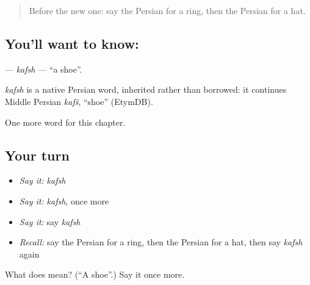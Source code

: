 \begin{quote}
Before the new one: say the Persian for a ring, then the Persian for a hat.
\end{quote}

\subsection*{You'll want to know: }
\textbf{} — \emph{kafsh} — \textquotedblleft{}a shoe\textquotedblright{}.

\begin{cousinweb}
\emph{kafsh} is a native Persian word, inherited rather than borrowed: it continues Middle Persian \emph{kafš}, \textquotedblleft{}shoe\textquotedblright{} (EtymDB).
\end{cousinweb}

\begin{grammarlens}[title={What you've built}]
One more word for this chapter.
\end{grammarlens}

\subsection*{Your turn}
\begin{itemize}
\raggedright
  \item \emph{Say it:} \emph{kafsh}
  \item \emph{Say it:} \emph{kafsh}, once more
  \item \emph{Say it:} say \emph{kafsh}
  \item \emph{Recall:} say the Persian for a ring, then the Persian for a hat, then say \emph{kafsh} again
\end{itemize}

\begin{tcolorbox}[breakable,colback=teal!4,colframe=teal!35!black,title={Before you move on}]
What does  mean? (\textquotedblleft{}A shoe\textquotedblright{}.) Say it once more.
\end{tcolorbox}
